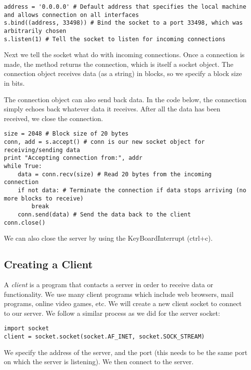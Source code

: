 \begin{lstlisting}
address = '0.0.0.0' # Default address that specifies the local machine and allows connection on all interfaces
s.bind((address, 33498)) # Bind the socket to a port 33498, which was arbitrarily chosen
s.listen(1) # Tell the socket to listen for incoming connections
\end{lstlisting}

Next we tell the socket what do with incoming connections.
Once a connection is made, the  method returns the connection, which is itself a socket object.
The connection object receives data (as a string) in blocks, so we specify a block size in bits.

The connection object can also send back data.
In the code below, the connection simply echoes back whatever data it receives.
After all the data has been received, we close the connection.


\begin{lstlisting}
size = 2048 # Block size of 20 bytes
conn, add = s.accept() # conn is our new socket object for receiving/sending data
print "Accepting connection from:", addr
while True:
	data = conn.recv(size) # Read 20 bytes from the incoming connection
	if not data: # Terminate the connection if data stops arriving (no more blocks to receive)
		break
	conn.send(data) # Send the data back to the client
conn.close()
\end{lstlisting}

We can also close the server by using the KeyBoardInterrupt (ctrl+c).

\subsection*{Creating a Client}
A \textit{client} is a program that contacts a server in order to receive data or functionality. We use many client programs which include web browsers, mail programs, online video games, etc.
We will create a new client socket to connect to our server. We follow a similar process as we did for the server socket:

\begin{lstlisting}
import socket
client = socket.socket(socket.AF_INET, socket.SOCK_STREAM)
\end{lstlisting}

We specify the address of the server, and the port (this needs to be the same port on which the server is listening). We then connect to the server.

